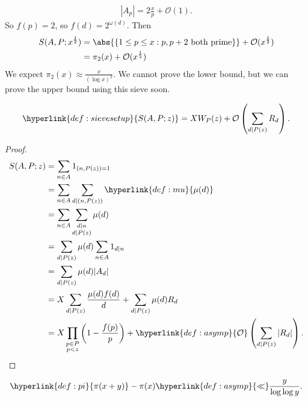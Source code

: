 \documentclass{article}
\newcommand{\1}{\mathbbm{1}}
\newcommand{\bigO}{\mathcal{O}}
\begin{document}
\begin{eg}
\begin{enumerate}[label=(\arabic*)]
      \begin{align*}
        |A_p| = 2\frac{x}{p} + \bigO(1).
      \end{align*}
      So $f(p) = 2$, so $f(d) = 2^{\omega(d)}$.
      Then
      \begin{align*}
        S(A,P; x^{\frac{1}{2}}) &= \abs{\{1 \leq p \leq x : p, p+2 \text{ both prime}\}} + \bigO(x^{\frac{1}{2}}) \\
                                &= \pi_2(x) + \bigO(x^{\frac 12})
      \end{align*}
      We expect $\pi_2(x) \approx \frac{x}{(\log x)^2}$. We cannot prove the lower bound, but we can prove the upper bound using this sieve soon.
  \end{enumerate}
\end{eg}
\begin{nthm}\label{thm:2.1}
  \begin{equation*}
    \hyperlink{def:sievesetup}{S(A,P; z)} = X W_P(z) + \bigO\left(\sum_{d \mid P(z)} R_d\right).
  \end{equation*}
\end{nthm}
\begin{proof}
  \begin{align*}
    S(A,P;z) &= \sum_{n \in A} 1_{(n, P(z)) = 1} \\
             &= \sum_{n \in A} \sum_{d \mid (n, P(z))}\hyperlink{def:mu}{ \mu(d)} \\
             &= \sum_{n \in A} \sum_{\substack{d \mid n \\ d \mid P(z)}} \mu(d) \\
             &= \sum_{d \mid P(z)} \mu(d) \sum_{n \in A} 1_{d \mid n} \\
             &= \sum_{d \mid P(z)} \mu(d) |A_d| \\
             &= X \sum_{d \mid P(z)} \frac{\mu(d) f(d)}{d} + \sum_{d \mid P(z)} \mu(d) R_d \\
             &= X \prod_{\substack{p \in P \\ p < z}} \left(1 - \frac{f(p)}{p}\right) + \hyperlink{def:asymp}{\bigO}\left(\sum_{d \mid P(z)} |R_d|\right). \qedhere
  \end{align*}
\end{proof}
\begin{ncor}\label{cor:2.2}
  \begin{equation*}
    \hyperlink{def:pi}{\pi(x+y)} - \pi(x) \hyperlink{def:asymp}{\ll} \frac{y}{\log \log y}.
  \end{equation*}
\end{ncor}
\end{document}
